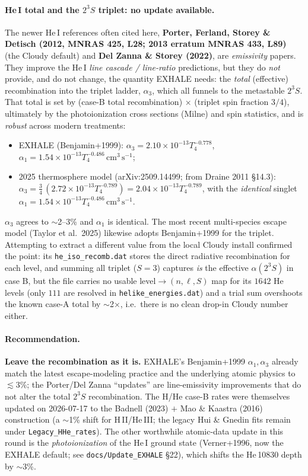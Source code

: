 \documentclass[english,a4paper]{my_memo}
\newcommand{\acm}{\ensuremath{\,\mathrm{cm^3\,s^{-1}}}}
\begin{document}
\paragraph{He\,I total and the $2^3S$ triplet: no update available.}
The newer He\,I references often cited here, \textbf{Porter, Ferland,
Storey \& Detisch (2012, MNRAS 425, L28; 2013 erratum MNRAS 433, L89)}
(the Cloudy default) and \textbf{Del Zanna \& Storey (2022)}, are
\emph{emissivity} papers. They improve the He\,I \emph{line cascade /
line-ratio} predictions, but they do \emph{not} provide, and do not
change, the quantity EXHALE needs: the \emph{total} (effective)
recombination into the triplet ladder, $\alpha_3$, which all funnels to
the metastable $2^3S$. That total is set by (case-B total recombination)
$\times$ (triplet spin fraction $3/4$), ultimately by the
photoionization cross sections (Milne) and spin statistics, and is
\emph{robust} across modern treatments:
\begin{itemize}
\item EXHALE (Benjamin+1999):
  $\alpha_3 = 2.10\times10^{-13}T_4^{-0.778}$,
  $\alpha_1 = 1.54\times10^{-13}T_4^{-0.486}\acm$;
\item 2025 thermosphere model (arXiv:2509.14499; from
  Draine 2011 \S14.3): $\alpha_3 = \tfrac34\,(2.72\times10^{-13}T_4^{-0.789})
  = 2.04\times10^{-13}T_4^{-0.789}$, with the \emph{identical} singlet
  $\alpha_1 = 1.54\times10^{-13}T_4^{-0.486}\acm$.
\end{itemize}
$\alpha_3$ agrees to $\sim$2--3\% and $\alpha_1$ is identical. The most
recent multi-species escape model (Taylor et al.\ 2025) likewise adopts
Benjamin+1999 for the triplet. Attempting to extract a different value
from the local Cloudy install confirmed the point: its
\texttt{he\_iso\_recomb.dat} stores the direct radiative
recombination for each level, and summing all triplet ($S=3$) captures \emph{is} the
effective $\alpha(2^3S)$ in case B, but the file carries no usable
level$\to(n,\ell,S)$ map for its $1642$ He levels (only $111$ are resolved
in \texttt{helike\_energies.dat}) and a trial sum overshoots the known
case-A total by $\sim$2$\times$, i.e.\ there is no clean drop-in Cloudy
number either.

\paragraph{Recommendation.} \textbf{Leave the recombination as it is.}
EXHALE's Benjamin+1999 $\alpha_1,\alpha_3$ already match the latest
escape-modeling practice and the underlying atomic physics to
$\lesssim3\%$; the Porter/Del Zanna ``updates'' are line-emissivity
improvements that do not alter the total $2^3S$ recombination. The H/He
case-B rates were themselves updated on 2026-07-17 to the Badnell (2023)
$+$ Mao \& Kaastra (2016) construction (a $\sim$1\% shift for H\,II/He\,III;
the legacy Hui \& Gnedin fits remain under \texttt{Legacy\_HHe\_rates}). The
other worthwhile atomic-data
update in this round is the \emph{photoionization} of the He\,I ground
state (Verner+1996, now the EXHALE default; see
\texttt{docs/Update\_EXHALE} \S22), which shifts the He\,10830 depth by
$\sim$3\%.
\end{document}
